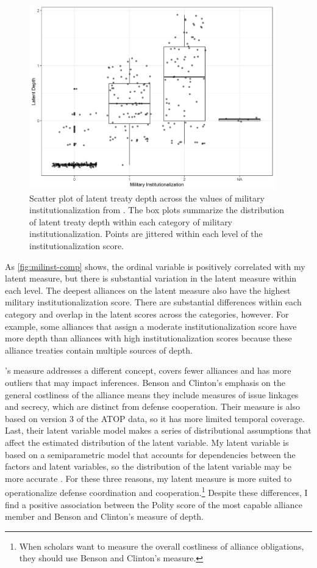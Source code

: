 \documentclass[12pt]{article}
\begin{document}
\begin{figure}[htbp]
	\centering
		\includegraphics[width=0.95\textwidth]{milinst-comp.png}
	\caption{Scatter plot of latent treaty depth across the values of military institutionalization from \citet{LeedsAnac2005}. The box plots summarize the distribution of latent treaty depth within each category of military institutionalization. Points are jittered within each level of the institutionalization score.}
	\label{fig:milinst-comp}
\end{figure} 


As \autoref{fig:milinst-comp} shows, the ordinal variable is positively correlated with my latent measure, but there is substantial variation in the latent measure within each level. 
The deepest alliances on the latent measure also have the highest military institutionalization score.
There are substantial differences within each category and overlap in the latent scores across the categories, however. 
For example, some alliances that \citet{LeedsAnac2005} assign a moderate institutionalization score have more depth than alliances with high institutionalization scores because these alliance treaties contain multiple sources of depth. 


\citet{BensonClinton2016}'s measure addresses a different concept, covers fewer alliances and has more outliers that may impact inferences.
Benson and Clinton's emphasis on the general costliness of the alliance means they include measures of issue linkages and secrecy, which are distinct from defense cooperation. 
Their measure is also based on version 3 of the ATOP data, so it has more limited temporal coverage. 
Last, their latent variable model makes a series of distributional assumptions that affect the estimated distribution of the latent variable. 
My latent variable is based on a semiparametric model that accounts for dependencies between the factors and latent variables, so the distribution of the latent variable may be more accurate \citep{Murrayetal2013}.
For these three reasons, my latent measure is more suited to operationalize defense coordination and cooperation.\footnote{When scholars want to measure the overall costliness of alliance obligations, they should use Benson and Clinton's measure.} 
Despite these differences, I find a positive association between the Polity score of the most capable alliance member and Benson and Clinton's measure of depth. 
\end{document}
